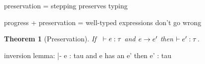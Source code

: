 \documentclass{article}
\newtheorem{Theorem}{Theorem}
\begin{document}
\noindent
preservation = stepping preserves typing

\noindent
progress + preservation = well-typed expressions don't go wrong



\newpage

\resetpfcounter
\begin{Theorem}[Preservation]
  If \usepfcounter[e types]~$\hastype{e}{\tau}$
  and \usepfcounter[e steps] $e \rightarrow e'$
  then \usepfcounter[e' types] $\hastype{e'}{\tau}$.
\end{Theorem}


inversion lemma: |- e : tau and e has an e' then e' : tau
\end{document}
